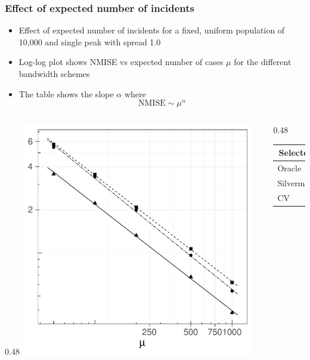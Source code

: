 \documentclass[notheorems]{beamer}
\theoremstyle{definition}
\theoremstyle{example}
\begin{document}
\begin{frame}\frametitle{Effect of expected number of incidents}
    \scriptsize
    \begin{itemize}
        \item Effect of expected number of incidents for a fixed, uniform population of 10,000 and single peak with spread 1.0
        \item Log-log plot shows NMISE vs expected number of cases $\mu$ for the different bandwidth schemes
        \item The table shows the slope $\alpha$ where
            $$
                \mbox{NMISE} \sim \mu^{\alpha}
            $$
    \end{itemize}
    \begin{columns}
        \begin{column}{0.48\textwidth}
            \includegraphics[width=0.9\textwidth]{results/by_num_cases/NMISE-vs-cases-log-log}
        \end{column}
        \begin{column}{0.48\textwidth}
            \begin{tabular}{lr}
                \toprule
                \multicolumn{1}{c}{Selector}&\multicolumn{1}{c}{Slope}\tabularnewline
                \midrule
                Oracle&$-0.742$\tabularnewline
                Silverman&$-0.741$\tabularnewline
                CV&$-0.775$\tabularnewline
                \bottomrule
            \end{tabular}
        \end{column}
    \end{columns}
\end{frame}
\end{document}
